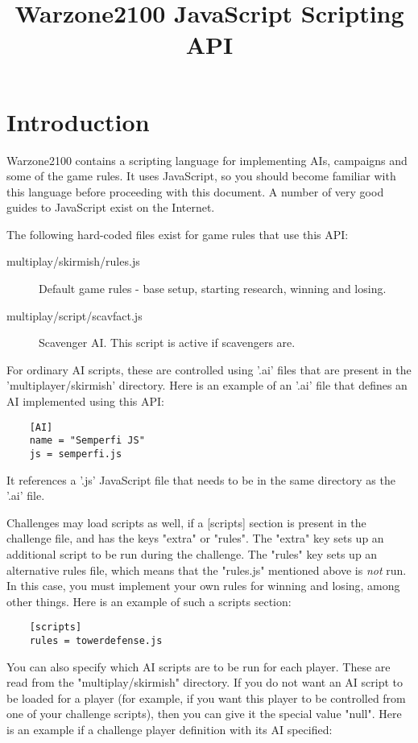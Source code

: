 \documentclass[12pt]{article}
\title{Warzone2100 JavaScript Scripting API}
\date{}
\begin{document}
\maketitle

\section{Introduction}

Warzone2100 contains a scripting language for implementing AIs, campaigns and some of the game
rules. It uses JavaScript, so you should become familiar with this language before proceeding
with this document. A number of very good guides to JavaScript exist on the Internet.

The following hard-coded files exist for game rules that use this API:

\begin{description}
	\item[multiplay/skirmish/rules.js] Default game rules - base setup, starting research, winning and losing.
	\item[multiplay/script/scavfact.js] Scavenger AI. This script is active if scavengers are.
\end{description}

For ordinary AI scripts, these are controlled using '.ai' files that are present in the 'multiplayer/skirmish'
directory. Here is an example of an '.ai' file that defines an AI implemented using this API:

\begin{verbatim}
	[AI]
	name = "Semperfi JS"
	js = semperfi.js
\end{verbatim}

It references a '.js' JavaScript file that needs to be in the same directory as the '.ai' file. 

Challenges may load scripts as well, if a [scripts] section is present in the challenge file, and has the keys 
"extra" or "rules". The "extra" key sets up an additional script to be run during the challenge. The "rules"
key sets up an alternative rules file, which means that the "rules.js" mentioned above is \emph{not} run. In
this case, you must implement your own rules for winning and losing, among other things. Here is an example
of such a scripts section:

\begin{verbatim}
	[scripts]
	rules = towerdefense.js
\end{verbatim}

You can also specify which AI scripts are to be run for each player. These are read from the "multiplay/skirmish"
directory. If you do not want an AI script to be loaded for a player (for example, if you want this player to be
controlled from one of your challenge scripts), then you can give it the special value "null". Here is an example
if a challenge player definition with its AI specified:
\end{document}
